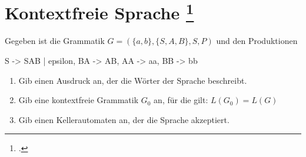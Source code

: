 \documentclass{lehramt-informatik-aufgabe}
\begin{document}
\section{Kontextfreie Sprache
\footcite{theo:ab:2}}

Gegeben ist die Grammatik $G = (\{a, b\}, \{S, A, B\}, S, P)$ und den
Produktionen

\begin{liProduktionsRegeln}
S -> SAB | epsilon,
BA -> AB,
AA -> aa,
BB -> bb
\end{liProduktionsRegeln}
\begin{enumerate}


\item Gib einen Ausdruck an, der die Wörter der Sprache beschreibt.


\item Gib eine kontextfreie Grammatik $G_0$ an, für die gilt:
$L(G_0) = L(G)$


\item Gib einen Kellerautomaten an, der die Sprache akzeptiert.

\end{enumerate}
\end{document}
